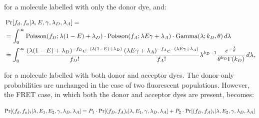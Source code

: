 for a molecule labelled with only the donor dye, and:

\begin{align}
\footnotesize
&\Pr[f_d, f_a| \lambda, E, \gamma, \lambda_{D}, \lambda_{A}] =\\ 
&= \int_0^{\infty}\text{Poisson}(f_D; \lambda (1-E) + \lambda_{D})\cdot\text{Poisson}(f_A; \lambda E \gamma + \lambda_{A}) \cdot \text{Gamma}(\lambda; k_D, \theta) \, d\lambda \\
&= \int_0^{\infty}\frac{(\lambda (1-E)+\lambda_{D})^{-f_D}e^{-(\lambda(1-E)+\lambda_{D})}}{f_D!}\frac{(\lambda E \gamma + \lambda_{A})^{-f_A}e^{-(\lambda E \gamma+\lambda_{A})}}{f_A!}\lambda^{k_D-1}\frac{e^{-\frac{\lambda}{\theta}}}{\theta^{k_D}\Gamma(k_D)} \, d\lambda ,
\label{eq:FRET_single}
\end{align} 

for a molecule labelled with both donor and acceptor dyes.  The donor-only probabilities are unchanged in the case of two fluorescent populations. However, the FRET case, in which both the donor and acceptor dyes are present, becomes: 

\begin{equation}
\footnotesize
\Pr[(f_d, f_a)_i | \lambda, E_1, E_2, \gamma, \lambda_{D}, \lambda_{A}] = P_1 \cdot \Pr[(f_D, f_A)_i | \lambda, E_1, \gamma, \lambda_{D}, \lambda_{A}] + P_2 \cdot \Pr[(f_D, f_A)_i | \lambda, E_2, \gamma, \lambda_{D}, \lambda_{A}] 
\label{eq:FRET_multi}
\end{equation}

 

